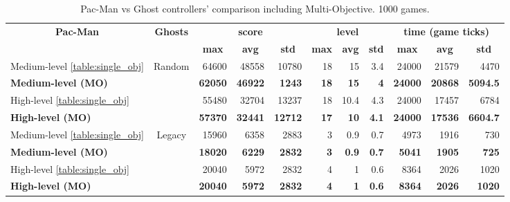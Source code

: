 \begin{sidewaystable}[]
\centering
\begin{tabular}{|l|c|r|r|r|r|r|r|r|r|r|}
\hline
\multicolumn{1}{|c|}{\multirow{2}{*}{\textbf{Pac-Man}}} & \multirow{2}{*}{\textbf{Ghosts}} & \multicolumn{3}{c|}{\textbf{score}} & \multicolumn{3}{c|}{\textbf{level}} & \multicolumn{3}{c|}{\textbf{time (game ticks)}} \\ \cline{3-11} 
\multicolumn{1}{|c|}{} &  & \multicolumn{1}{c|}{\textbf{max}} & \multicolumn{1}{c|}{\textbf{avg}} & \multicolumn{1}{c|}{\textbf{std}} & \multicolumn{1}{c|}{\textbf{max}} & \multicolumn{1}{c|}{\textbf{avg}} & \multicolumn{1}{c|}{\textbf{std}} & \multicolumn{1}{c|}{\textbf{max}} & \multicolumn{1}{c|}{\textbf{avg}} & \multicolumn{1}{c|}{\textbf{std}} \\ \hline
Medium-level \ref{table:single_obj} & \multirow{4}{*}{Random} & {64600} & {48558} & {10780} & {18} & {15} & {3.4} & {24000} & {21579} & {4470} \\ \cline{1-1} \cline{3-11} 
\textbf{Medium-level (MO)} &  & \textbf{62050} & \textbf{46922} & \textbf{1243} & \textbf{18} & \textbf{15} & \textbf{4} & \textbf{24000} & \textbf{20868} & \textbf{5094.5} \\ \cline{1-1} \cline{3-11} 
{High-level \ref{table:single_obj}} &  & {55480} & {32704} & {13237} & {18} & {10.4} & {4.3} & {24000} & {17457} & {6784} \\ \cline{1-1} \cline{3-11} 
\textbf{High-level (MO)} &  & \textbf{57370} & \textbf{32441} & \textbf{12712} & \textbf{17} & \textbf{10} & \textbf{4.1} & \textbf{24000} & \textbf{17536} & \textbf{6604.7} \\ \hline
{Medium-level \ref{table:single_obj}} & \multirow{4}{*}{Legacy} & {15960} & {6358} & {2883} & {3} & {0.9} & {0.7} & {4973} & {1916} & {730} \\ \cline{1-1} \cline{3-11} 
\textbf{Medium-level (MO)} &  & \textbf{18020} & \textbf{6229} & \textbf{2832} & \textbf{3} & \textbf{0.9} & \textbf{0.7} & \textbf{5041} & \textbf{1905} & \textbf{725} \\ \cline{1-1} \cline{3-11} 
{High-level \ref{table:single_obj}} &  & {20040} & {5972} & {2832} & {4} & {1} & {0.6} & {8364} & {2026} & {1020} \\ \cline{1-1} \cline{3-11} 
\textbf{High-level (MO)} &  & \textbf{20040} & \textbf{5972} & \textbf{2832} & \textbf{4} & \textbf{1} & \textbf{0.6} & \textbf{8364} & \textbf{2026} & \textbf{1020} \\ \hline
\end{tabular}
\caption{Pac-Man vs Ghost controllers' comparison including Multi-Objective. 1000 games.}
\label{table:multi-objective}
\end{sidewaystable}

